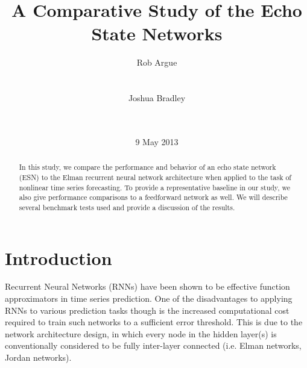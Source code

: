 \documentclass{acm_proc_article-sp}
\begin{document}
\title{A Comparative Study of the Echo State Networks}

\author{
\alignauthor
Rob Argue\\
       \\
       \\
\alignauthor
Joshua Bradley\\
       \\
       \\
}

\date{9 May 2013}

\maketitle
\begin{abstract}
In this study, we compare the performance and behavior of an echo state network (ESN) to the Elman recurrent neural network architecture when applied to the task of nonlinear time series forecasting. To provide a representative baseline in our study, we also give performance comparisons to a feedforward network as well. We will describe several benchmark tests used and provide a discussion of the results.
\end{abstract}

\section{Introduction}
Recurrent Neural Networks (RNNs) have been shown to be effective function approximators in time series prediction. One of the disadvantages to applying RNNs to various prediction tasks though is the increased computational cost required to train such networks to a sufficient error threshold. This is due to the network architecture design, in which every node in the hidden layer(s) is conventionally considered to be fully inter-layer connected (i.e. Elman networks, Jordan networks).
\end{document}
